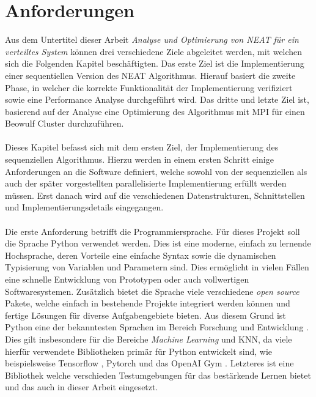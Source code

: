 \section{Anforderungen}
Aus dem Untertitel dieser Arbeit \emph{Analyse und Optimierung von \ac{NEAT} für ein verteiltes System} können drei verschiedene Ziele abgeleitet werden, mit welchen sich die Folgenden Kapitel beschäftigten. Das erste Ziel ist die Implementierung einer sequentiellen Version des \ac{NEAT} Algorithmus. Hierauf basiert die zweite Phase, in welcher die korrekte Funktionalität der Implementierung verifiziert sowie eine Performance Analyse durchgeführt wird. Das dritte und letzte Ziel ist, basierend auf der Analyse eine Optimierung des Algorithmus mit \ac{MPI} für einen Beowulf Cluster durchzuführen.  
\\\\
Dieses Kapitel befasst sich mit dem ersten Ziel, der Implementierung des sequenziellen Algorithmus. Hierzu werden in einem ersten Schritt einige Anforderungen an die Software definiert, welche sowohl von der sequenziellen als auch der später vorgestellten parallelisierte Implementierung erfüllt werden müssen. Erst danach wird auf die verschiedenen Datenstrukturen, Schnittstellen und Implementierungsdetails eingegangen.
\\\\
Die erste Anforderung betrifft die Programmiersprache. Für dieses Projekt soll die Sprache Python verwendet werden. Dies ist eine moderne, einfach zu lernende Hochsprache, deren Vorteile eine einfache Syntax sowie die dynamischen Typisierung von Variablen und Parametern sind. Dies ermöglicht in vielen Fällen eine schnelle Entwicklung von Prototypen oder auch vollwertigen Softwaresystemen. Zusätzlich bietet die Sprache viele verschiedene \emph{open source} Pakete, welche einfach in bestehende Projekte integriert werden können und fertige Lösungen für diverse Aufgabengebiete bieten. Aus diesem Grund ist Python eine der bekanntesten Sprachen im Bereich Forschung und Entwicklung \cite{dalcin2011parallel}. Dies gilt insbesondere für die Bereiche \emph{Machine Learning} und \ac{KNN}, da viele hierfür verwendete Bibliotheken primär für Python entwickelt sind, wie beispielsweise Tensorflow \cite{tensorflow2015}, Pytorch \cite{pytorch2019} und das OpenAI Gym \cite{OpenAiGym2016}. Letzteres ist eine Bibliothek welche verschieden Testumgebungen für das bestärkende Lernen bietet und das auch in dieser Arbeit eingesetzt.  
\\\\
